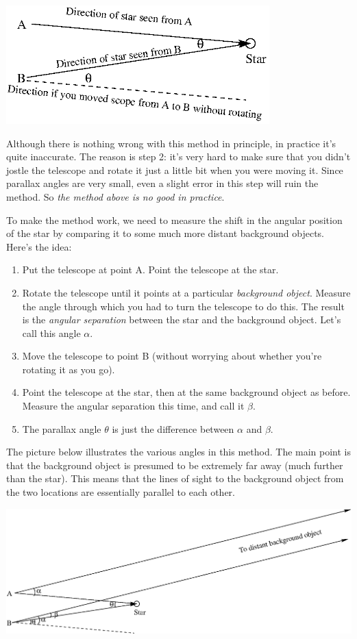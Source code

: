 \centerline{\includegraphics[width=4in]{figs/parallax.eps}}

Although there is nothing wrong with this method in principle,
in practice it's quite inaccurate.  The reason is step 2: it's very hard
to make sure that you didn't jostle the telescope and rotate it just a little
bit when you were moving it.  Since parallax angles are very small, even
a slight error in this step will ruin the method.  So {\it the method above
is no good in practice}.

To make the method work, we need to measure the shift in the angular
position of the star by comparing it to some much more distant background
objects.  Here's the idea:
\begin{enumerate}
\item Put the telescope at point A.  Point the telescope at the
star.
\item Rotate the telescope until it points at a particular {\it background
object}.  Measure the angle through which you had to turn the telescope
to do this.  The result is the {\it angular separation} between the
star and the background object.  Let's call this angle $\alpha$.
\item Move the telescope to point B (without worrying about whether
you're rotating it as you go).
\item Point the telescope at the star, then at the same background
object as before.  Measure the angular separation this time, and call
it $\beta$.
\item The parallax angle $\theta$ is just the difference between
$\alpha$ and $\beta$.
\end{enumerate}
The picture below illustrates the various angles in this
method.  The main point is that
the background object is presumed to be extremely far away (much further
than the star).  This means that the lines of sight to the background
object from the two locations are essentially parallel to each other.

\centerline{\includegraphics[width=6in]{figs/parallax2.eps}}



